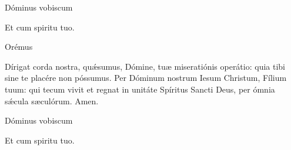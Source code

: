 

\rubric{\Vbar} Dóminus vobiscum

\rubric{\Rbar} Et cum spiritu tuo.

Orémus

Dírigat corda nostra, quǽsumus, Dómine, tuæ miseratiónis operátio: quia tibi sine te placére non póssumus. Per Dóminum nostrum Iesum Christum, Fílium tuum: qui tecum vivit et regnat in unitáte Spíritus Sancti Deus, per ómnia sǽcula sæculórum.\rubric{\Rbar} Amen.

\rubric{\Vbar} Dóminus vobiscum

\rubric{\Rbar} Et cum spiritu tuo.
